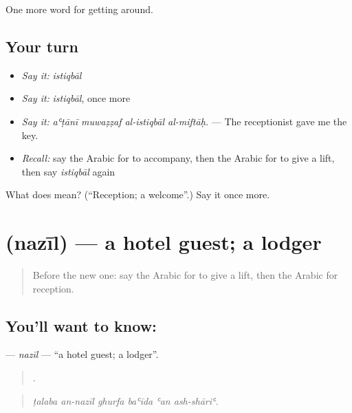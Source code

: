 \begin{grammarlens}[title={What you've built}]
One more word for getting around.
\end{grammarlens}

\subsection*{Your turn}
\begin{itemize}
\raggedright
  \item \emph{Say it:} \emph{istiqbāl}
  \item \emph{Say it:} \emph{istiqbāl}, once more
  \item \emph{Say it:} \emph{aʿṭānī muwaẓẓaf al-istiqbāl al-miftāḥ.} — The receptionist gave me the key.
  \item \emph{Recall:} say the Arabic for to accompany, then the Arabic for to give a lift, then say \emph{istiqbāl} again
\end{itemize}

\begin{tcolorbox}[breakable,colback=teal!4,colframe=teal!35!black,title={Before you move on}]
What does  mean? (\textquotedblleft{}Reception; a welcome\textquotedblright{}.) Say it once more.
\end{tcolorbox}
\section[\texorpdfstring{\ar{نزيل} (nazīl)}{نزيل (nazīl)}]{ (nazīl) — a hotel guest; a lodger}

\label{lesson:AR-C441-nazil}



\begin{quote}
Before the new one: say the Arabic for to give a lift, then the Arabic for reception.
\end{quote}

\subsection*{You'll want to know: }
\textbf{} — \emph{nazīl} — \textquotedblleft{}a hotel guest; a lodger\textquotedblright{}.

\begin{quote}
     .
\end{quote}

\begin{quote}
\emph{ṭalaba an-nazīl ghurfa baʿīda ʿan ash-shāriʿ.}
\end{quote}

